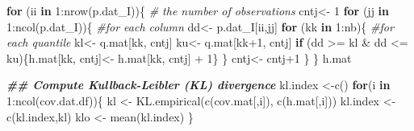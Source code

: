 \documentclass[
]{book}
\newenvironment{Shaded}{\begin{snugshade}}{\end{snugshade}}
\newcommand{\CommentTok}[1]{\textcolor[rgb]{0.56,0.35,0.01}{\textit{#1}}}
\newcommand{\ControlFlowTok}[1]{\textcolor[rgb]{0.13,0.29,0.53}{\textbf{#1}}}
\newcommand{\DecValTok}[1]{\textcolor[rgb]{0.00,0.00,0.81}{#1}}
\newcommand{\DocumentationTok}[1]{\textcolor[rgb]{0.56,0.35,0.01}{\textbf{\textit{#1}}}}
\newcommand{\FunctionTok}[1]{\textcolor[rgb]{0.00,0.00,0.00}{#1}}
\newcommand{\NormalTok}[1]{#1}
\newcommand{\OtherTok}[1]{\textcolor[rgb]{0.56,0.35,0.01}{#1}}
\newcommand{\SpecialCharTok}[1]{\textcolor[rgb]{0.00,0.00,0.00}{#1}}
\begin{document}
\begin{Shaded}
\begin{Highlighting}[]
    \ControlFlowTok{for}\NormalTok{ (ii }\ControlFlowTok{in} \DecValTok{1}\SpecialCharTok{:}\FunctionTok{nrow}\NormalTok{(p.dat\_I))\{ }\CommentTok{\# the number of observations}
\NormalTok{      cntj}\OtherTok{\textless{}{-}} \DecValTok{1} 
      \ControlFlowTok{for}\NormalTok{ (jj }\ControlFlowTok{in} \DecValTok{1}\SpecialCharTok{:}\FunctionTok{ncol}\NormalTok{(p.dat\_I))\{ }\CommentTok{\#for each column}
\NormalTok{        dd}\OtherTok{\textless{}{-}}\NormalTok{ p.dat\_I[ii,jj]  }
        \ControlFlowTok{for}\NormalTok{ (kk }\ControlFlowTok{in} \DecValTok{1}\SpecialCharTok{:}\NormalTok{nb)\{  }\CommentTok{\#for each quantile}
\NormalTok{          kl}\OtherTok{\textless{}{-}}\NormalTok{ q.mat[kk, cntj] }
\NormalTok{          ku}\OtherTok{\textless{}{-}}\NormalTok{ q.mat[kk}\SpecialCharTok{+}\DecValTok{1}\NormalTok{, cntj] }
          \ControlFlowTok{if}\NormalTok{ (dd }\SpecialCharTok{\textgreater{}=}\NormalTok{ kl }\SpecialCharTok{\&}\NormalTok{ dd }\SpecialCharTok{\textless{}=}\NormalTok{ ku)\{h.mat[kk, cntj]}\OtherTok{\textless{}{-}}\NormalTok{ h.mat[kk, cntj] }\SpecialCharTok{+} \DecValTok{1}\NormalTok{\}}
\NormalTok{        \}}
\NormalTok{        cntj}\OtherTok{\textless{}{-}}\NormalTok{ cntj}\SpecialCharTok{+}\DecValTok{1}
\NormalTok{      \}}
\NormalTok{    \}}
\NormalTok{    h.mat }
    
    
    \DocumentationTok{\#\# Compute Kullback{-}Leibler (KL) divergence}
\NormalTok{    kl.index }\OtherTok{\textless{}{-}}\FunctionTok{c}\NormalTok{()}
    \ControlFlowTok{for}\NormalTok{(i }\ControlFlowTok{in} \DecValTok{1}\SpecialCharTok{:}\FunctionTok{ncol}\NormalTok{(cov.dat.df))\{}
\NormalTok{      kl }\OtherTok{\textless{}{-}}    \FunctionTok{KL.empirical}\NormalTok{(}\FunctionTok{c}\NormalTok{(cov.mat[,i]), }\FunctionTok{c}\NormalTok{(h.mat[,i]))}
\NormalTok{      kl.index }\OtherTok{\textless{}{-}} \FunctionTok{c}\NormalTok{(kl.index,kl)}
\NormalTok{      klo }\OtherTok{\textless{}{-}}  \FunctionTok{mean}\NormalTok{(kl.index)}
\NormalTok{    \}}
  

\end{Highlighting}
\end{Shaded}
\end{document}
